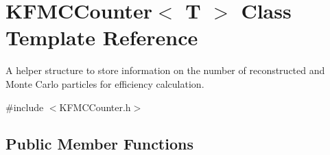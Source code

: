 \hypertarget{structKFMCCounter}{}\section{K\+F\+M\+C\+Counter$<$ T $>$ Class Template Reference}
\label{structKFMCCounter}


A helper structure to store information on the number of reconstructed and Monte Carlo particles for efficiency calculation.  




{\ttfamily \#include $<$K\+F\+M\+C\+Counter.\+h$>$}

\subsection*{Public Member Functions}

